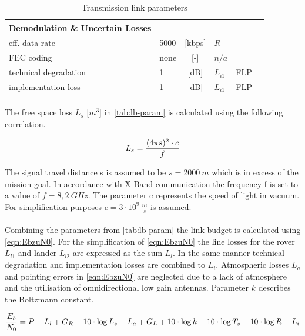 \begin{table}[h]
\begin{tabular}{llclll}
Demodulation \& Uncertain Losses &        &            &               &                              &  \\ \hline\hline
eff. data rate                   & 5000   & {[}kbps{]} & ${R}$         &                              &  \\
FEC coding                       & none   & {[}-{]}    & ${n/a}$       &                              &  \\
technical degradation            & 1      & {[}dB{]}   & ${L}_{i1}$    & FLP                          &  \\
implementation loss              & 1      & {[}dB{]}   & ${L}_{i1}$	   & FLP                          &  \\
                                 &        &            &               &                              & 
\end{tabular}
\caption{Transmission link parameters}
\label{tab:lb-param}
\end{table}

The free space loss ${L}_{s}$ [$m^3$] in \autoref{tab:lb-param} is calculated using the following correlation. 

\begin{equation}
	\centering
		{L}_{s} = {\frac{(4 \pi s)^2 \cdot c}{f}}
	\label{eqn:Ls}
\end{equation}

The signal travel distance {s} is assumed to be $s = 2000\ m$ which is in excess of the mission goal. In accordance with X-Band communication the frequency {f} is set to a value of $f = 8,2\ GHz$. The parameter c represents the speed of light in vacuum. For simplification purposes $c = 3 \cdot 10^9\ \frac{m}{s}$ is assumed. \\ \\   
Combining the parameters from \autoref{tab:lb-param} the link budget is calculated using \autoref{eqn:EbzuN0}. For the simplification of \autoref{eqn:EbzuN0} the line losses for the rover ${L}_{l1}$ and lander ${L}_{l2}$ are expressed as the sum ${L}_{l}$. In the same manner technical degradation and implementation losses are combined to ${L}_{i}$. Atmospheric losses ${L}_{a}$ and pointing errors in \autoref{eqn:EbzuN0} are neglected due to a lack of atmosphere and the utilisation of omnidirectional low gain antennas. Parameter ${k}$ describes the Boltzmann constant.   

\begin{equation}
  \centering
		{\frac{{E}_{b}}{{N}_{0}}} = {P} - {L}_{l} + {G}_{R} - {10\cdot \log{{L}_{s}}} - {L}_{a} + {G}_{L} + {10\cdot \log{k}} - {10\cdot \log{{T}_{s}}} - {10\cdot \log{{R}}} - {L}_{i}
	\label{eqn:EbzuN0}
\end{equation}


